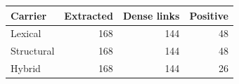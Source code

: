 \begin{tabular}{@{}lrrr@{}}
\toprule
Carrier & Extracted & Dense links & Positive \\
\midrule
Lexical & 168 & 144 & 48 \\
Structural & 168 & 144 & 48 \\
Hybrid & 168 & 144 & 26 \\
\bottomrule
\end{tabular}

